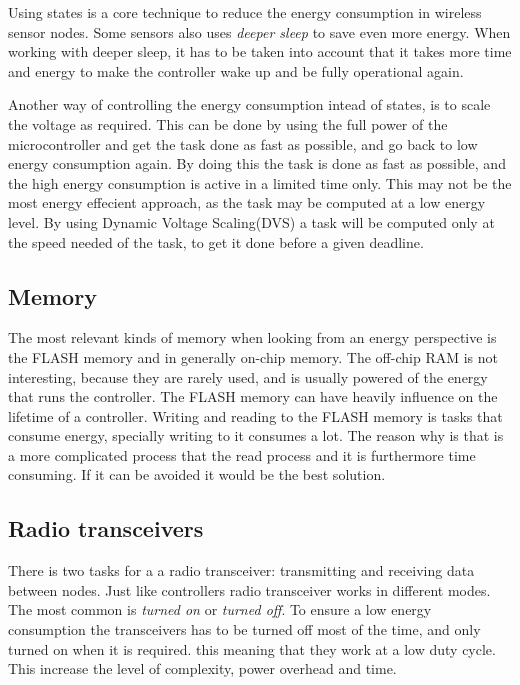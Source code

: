 Using states is a core technique to reduce the energy consumption in wireless sensor nodes. Some sensors also uses \emph{deeper sleep} to save even more energy. When working with deeper sleep, it has to be taken into account that it takes more time and energy to make the controller wake up and be fully operational again.

Another way of controlling the energy consumption intead of states, is to scale the voltage as required. This can be done by using the full power of the microcontroller and get the task done as fast as possible, and go back to low energy consumption again. By doing this the task is done as fast as possible, and the high energy consumption is active in a limited time only. This may not be the most energy effecient approach, as the task may be computed at a low energy level. By using Dynamic Voltage Scaling(DVS) a task will be computed only at the speed needed of the task, to get it done before a given deadline.

\subsection{Memory}
 The most relevant kinds of memory when looking from an energy perspective is the FLASH memory and in generally on-chip memory. The off-chip RAM is not interesting, because they are rarely used, and is usually powered of the energy that runs the controller.
 The FLASH memory can have heavily influence on the lifetime of a controller. Writing and reading to the FLASH memory is tasks that consume energy, specially writing to it consumes a lot. The reason why is that is a more complicated process that the read process and it is furthermore time consuming.
 If it can be avoided it would be the best solution.  
 
 \subsection{Radio transceivers}
  
  There is two tasks for a a radio transceiver: transmitting and receiving data between nodes. Just like controllers radio transceiver works in different modes. The most common is \emph{turned on} or \emph{turned off}. To ensure a low energy consumption the transceivers has to be turned off most of the time, and only turned on when it is required. this meaning that they work at a low duty cycle.
  This increase the level of complexity, power overhead and time. 
  
